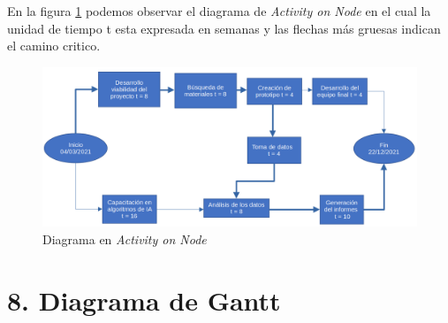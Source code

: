 \documentclass[11pt]{charter}
\begin{document}



En la figura \ref{fig:AoN} podemos observar el diagrama de \textit{Activity on Node} en el cual la unidad de tiempo t esta expresada en semanas y las flechas más gruesas indican el camino critico.
\newline

\begin{figure}[htpb]
\centering 
\includegraphics[width=.8\textwidth]{./Figuras/diagAoN.png}
\caption{Diagrama en \textit{Activity on Node}}
\label{fig:AoN}
\end{figure}


\section{8. Diagrama de Gantt}
\label{sec:gantt}
\end{document}
